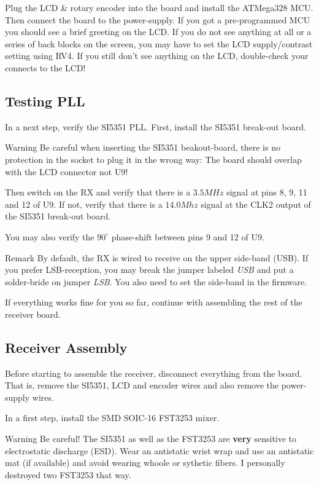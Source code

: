 \documentclass[10pt, a4paper,twoside,openright]{scrartcl}
\newenvironment{remark}{\begin{bclogo}[couleur=blue!30,arrondi=.1,logo=\bcinfo,ombre=true]{Remark}}{\end{bclogo}}
\newenvironment{warning}{\begin{bclogo}[couleur=red!30,arrondi=.1,logo=\bcattention,ombre=true]{Warning}}{\end{bclogo}}
\begin{document}
 Plug the LCD \& rotary encoder into the board and install the ATMega328 MCU. Then connect the board to the power-supply. If you got a pre-programmed MCU you should see a brief greeting on the LCD. If you do not see anything at all or a series of back blocks on the screen, you may have to set the LCD supply/contrast setting using RV4. If you still don't see anything on the LCD, double-check your connects to the LCD! 

\subsection{Testing PLL}
In a next step, verify the SI5351 PLL. First, install the SI5351 break-out board. 

\begin{warning}
 Be careful when inserting the SI5351 beakout-board, there is no protection in the socket to plug it in the wrong way: The board should overlap with the LCD connector not U9!
\end{warning}
 
Then switch on the RX and verify that there is a $3.5MHz$ signal at pins 8, 9, 11 and 12 of U9. If not, verify that there is a $14.0Mhz$ signal at the CLK2 output of the SI5351 break-out board. 

You may also verify the $90^\circ$ phase-shift between pins 9 and 12 of U9.

\begin{remark}
By default, the RX is wired to receive on the upper side-band (USB). If you prefer LSB-reception, you may break the jumper labeled \emph{USB} and put a solder-bride on jumper \emph{LSB}. You also need to set the side-band in the firmware.
\end{remark} 

If everything works fine for you so far, continue with assembling the rest of the receiver board.


\subsection{Receiver Assembly}
Before starting to assemble the receiver, disconnect everything from the board. That is, remove the SI5351, LCD and encoder wires and also remove the power-supply wires.

In a first step, install the SMD SOIC-16 FST3253 mixer. 

\begin{warning}
 Be careful! The SI5351 as well as the FST3253 are \textbf{very} sensitive to electrostatic discharge (ESD). Wear an antistatic wrist wrap and use an antistatic mat (if available) and avoid wearing whoole or sythetic fibers. I personally destroyed two FST3253 that way. 
\end{warning}
\end{document}
